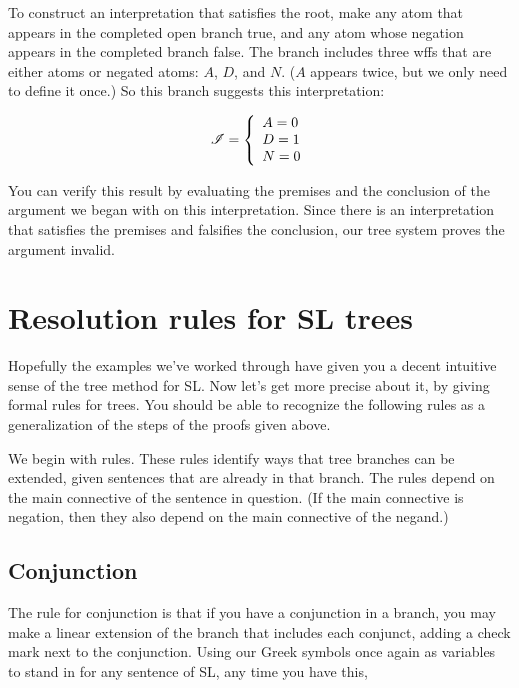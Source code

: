 To construct an interpretation that satisfies the root, make any atom that appears in the completed open branch true, and any atom whose negation appears in the completed branch false. 
 The branch includes three wffs that are either atoms or negated atoms: \enot $A$, $D$, and \enot $N$. (\enot $A$ appears twice, but we only need to define it once.) So this branch suggests this interpretation:

\begin{displaymath}
\mathscr{I} =
\left\{
	\begin{array}{ll}
	A = 0\\
	D = 1\\
	N = 0
	\end{array}
\right.
\end{displaymath}

You can verify this result by evaluating the premises and the conclusion of the argument we began with on this interpretation. Since there is an interpretation that satisfies the premises and falsifies the conclusion, our tree system proves the argument invalid.

\section{Resolution rules for SL trees}
\label{sec.SLtreerules}

Hopefully the examples we've worked through have given you a decent intuitive sense of the tree method for SL. Now let's get more precise about it, by giving formal rules for trees. You should be able to recognize the following rules as a generalization of the steps of the proofs given above.

We begin with  rules. These rules identify ways that tree branches can be extended, given sentences that are already in that branch. The rules depend on the main connective of the sentence in question. (If the main connective is negation, then they also depend on the main connective of the negand.)
\label{SL.treerules.start}
\subsection{Conjunction}

The rule for conjunction is that if you have a conjunction in a branch, you may make a linear extension of the branch that includes each conjunct, adding a check mark next to the conjunction. Using our Greek symbols once again as variables to stand in for any sentence of SL, any time you have this,

